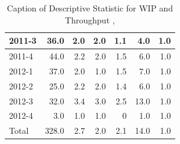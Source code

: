 \documentclass[UKenglish]{ifimaster}  %
\begin{document}
\begin{table}[!htbp]
\begin{adjustwidth}{-2.5cm}{}
{{\begin{tabular}{ | l | r | r | r | r | r | r | }
2011-3 & 36.0 & 2.0 & 2.0 & 1.1 & 4.0 & 1.0\\ \hline
2011-4 & 44.0 & 2.2 & 2.0 & 1.5 & 6.0 & 1.0\\ \hline
2012-1 & 37.0 & 2.0 & 1.0 & 1.5 & 7.0 & 1.0\\ \hline
2012-2 & 25.0 & 2.2 & 2.0 & 1.4 & 6.0 & 1.0\\ \hline
2012-3 & 32.0 & 3.4 & 3.0 & 2.5 & 13.0 & 1.0\\ \hline
2012-4 & 3.0 & 1.0 & 1.0 & 0 & 1.0 & 1.0\\ \hline
Total & 328.0 & 2.7 & 2.0 & 2.1 & 14.0 & 1.0\\ \hline
\end{tabular}
}
}
\end{adjustwidth}
\caption[Optional caption for list of figures]{Caption of Descriptive Statistic for WIP and Throughput  , }
\label{DS:7:1}
\end{table}
\end{document}
